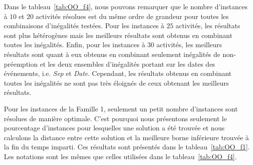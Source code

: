 Dans le tableau~\ref{tab:OO_f4}, nous pouvons remarquer que le nombre
d'instances à $10$ et $20$ activités résolues est du même ordre de
grandeur pour toutes les combinaisons d'inégalités testées. Pour les
instances à $25$ activités, les résultats sont plus hétérogènes mais
les meilleurs résultats sont obtenus en combinant toutes les
inégalités. Enfin, pour les instances à $30$ activités, les meilleurs
résultats sont quant à eux obtenus en combinant seulement inégalités
de non-préemption et les deux ensembles d'inégalités portant sur les
dates des événements, i.e. {\it Sep} et {\it Date}. Cependant, les
résultats obtenus en combinant toutes les inégalités ne sont pas très
éloignés de ceux obtenant les meilleurs résultats.

Pour les instances de la Famille 1, seulement un petit nombre
d'instances sont résolues de manière optimale. C'est pourquoi nous
présentons seulement le pourcentage d'instances pour lesquelles une
solution a été trouvée et nous calculons la distance entre cette
solution et la meilleure borne inférieure trouvée à la fin du temps
imparti. Ces résultats sont présentés dans le
tableau~\ref{tab:OO_f1}. Les notations sont les mêmes que celles
utilisées dans le tableau~\ref{tab:OO_f4}.

